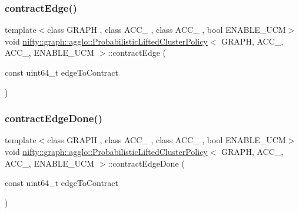 \subsubsection{\texorpdfstring{contract\+Edge()}{contractEdge()}}
{\footnotesize\ttfamily template$<$class G\+R\+A\+PH , class A\+C\+C\+\_ , class A\+C\+C\+\_ , bool E\+N\+A\+B\+L\+E\+\_\+\+U\+CM$>$ \\
void \hyperlink{classnifty_1_1graph_1_1agglo_1_1ProbabilisticLiftedClusterPolicy}{nifty\+::graph\+::agglo\+::\+Probabilistic\+Lifted\+Cluster\+Policy}$<$ G\+R\+A\+PH, A\+C\+C\+\_, A\+C\+C\+\_, E\+N\+A\+B\+L\+E\+\_\+\+U\+CM $>$\+::contract\+Edge (\begin{DoxyParamCaption}\item[{const uint64\+\_\+t}]{edge\+To\+Contract }\end{DoxyParamCaption})\hspace{0.3cm}{\ttfamily [inline]}}

\mbox{\label{classnifty_1_1graph_1_1agglo_1_1ProbabilisticLiftedClusterPolicy_ab98af5a72c945086a6fac570200305c7}} 
\subsubsection{\texorpdfstring{contract\+Edge\+Done()}{contractEdgeDone()}}
{\footnotesize\ttfamily template$<$class G\+R\+A\+PH , class A\+C\+C\+\_ , class A\+C\+C\+\_ , bool E\+N\+A\+B\+L\+E\+\_\+\+U\+CM$>$ \\
void \hyperlink{classnifty_1_1graph_1_1agglo_1_1ProbabilisticLiftedClusterPolicy}{nifty\+::graph\+::agglo\+::\+Probabilistic\+Lifted\+Cluster\+Policy}$<$ G\+R\+A\+PH, A\+C\+C\+\_, A\+C\+C\+\_, E\+N\+A\+B\+L\+E\+\_\+\+U\+CM $>$\+::contract\+Edge\+Done (\begin{DoxyParamCaption}\item[{const uint64\+\_\+t}]{edge\+To\+Contract }\end{DoxyParamCaption})\hspace{0.3cm}{\ttfamily [inline]}}

